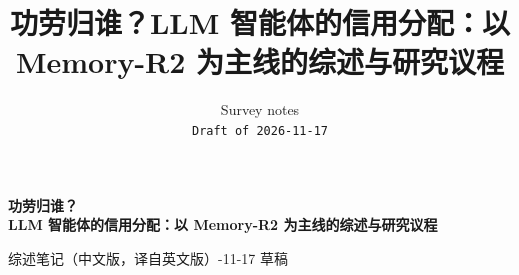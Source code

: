 \documentclass[10pt]{article}
\title{功劳归谁？LLM 智能体的信用分配：以 Memory-R2 为主线的综述与研究议程}
\author{%
  Survey notes\\
  \texttt{Draft of 2026-11-17}
}
\begin{document}
\ifdefined\usingofficialstyle\else
\begin{center}
  {\LARGE\bfseries 功劳归谁？\\[3pt]
  {\Large LLM 智能体的信用分配：以 Memory-R2 为主线的综述与研究议程}\par}
  \vspace{1em}
  {\normalsize 综述笔记（中文版，译自英文版）\quad\textperiodcentered{}-11-17 草稿\par}
  \vspace{1.5em}
\end{center}
\fi
\ifdefined\usingofficialstyle\maketitle\fi















\appendix

\end{document}
